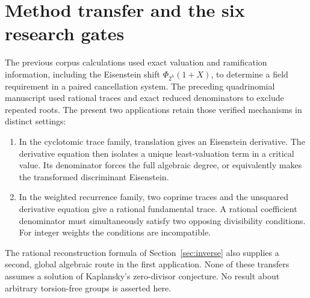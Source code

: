 \documentclass[11pt,a4paper]{article}
\theoremstyle{definition}
\theoremstyle{remark}
\begin{document}
\section{Method transfer and the six research gates}\label{sec:gates}

The previous corpus calculations used exact valuation and
ramification information, including the Eisenstein shift
$\Phi_{2^h}(1+X)$, to determine a field requirement in a paired
cancellation system. The preceding quadrinomial manuscript
\cite{Previous} used rational traces and exact reduced denominators
to exclude repeated roots. The present two applications retain
those verified mechanisms in distinct settings:
\begin{enumerate}
 \item In the cyclotomic trace family, translation gives an
 Eisenstein derivative. The derivative equation then isolates a
 unique least-valuation term in a critical value. Its denominator
 forces the full algebraic degree, or equivalently makes the
 transformed discriminant Eisenstein.
 \item In the weighted recurrence family, two coprime traces and
 the unsquared derivative equation give a rational fundamental
 trace. A rational coefficient denominator must simultaneously
 satisfy two opposing divisibility conditions. For integer
 weights the conditions are incompatible.
\end{enumerate}
The rational reconstruction formula of Section~\ref{sec:inverse}
also supplies a second, global algebraic route in the first
application. None of these transfers assumes a solution of
Kaplansky's zero-divisor conjecture. No result about arbitrary
torsion-free groups is asserted here.

\end{document}
